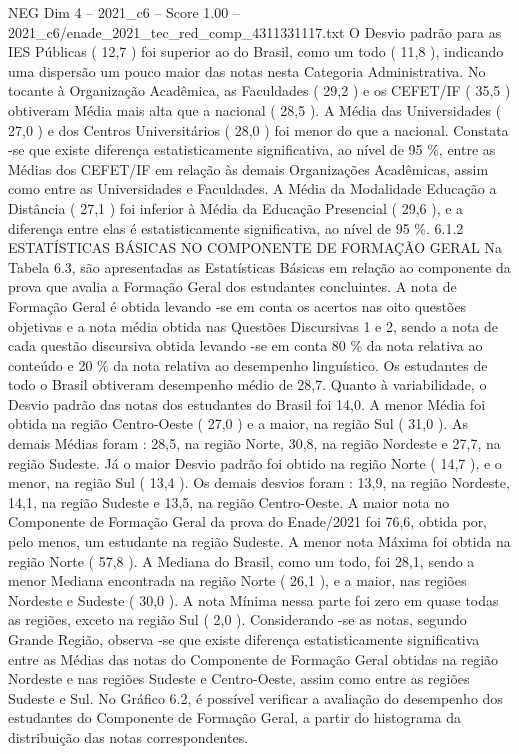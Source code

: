 \begin{textsample}{NEG Dim 4 – 2021\_c6 – Score 1.00 – 2021\_c6/enade\_2021\_tec\_red\_comp\_4311331117.txt}
O Desvio padrão para as IES Públicas ( 12,7 ) foi superior ao do Brasil, como um todo ( 11,8 ), indicando uma dispersão um pouco maior das notas nesta Categoria Administrativa.
No tocante à Organização Acadêmica, as Faculdades ( 29,2 ) e os CEFET/IF ( 35,5 ) obtiveram Média mais alta que a nacional ( 28,5 ).
A Média das Universidades ( 27,0 ) e dos Centros Universitários ( 28,0 ) foi menor do que a nacional.
Constata -se que existe diferença estatisticamente significativa, ao nível de 95 \%, entre as Médias dos CEFET/IF em relação às demais Organizações Acadêmicas, assim como entre as Universidades e Faculdades.
A Média da Modalidade Educação a Distância ( 27,1 ) foi inferior à Média da Educação Presencial ( 29,6 ), e a diferença entre elas é estatisticamente significativa, ao nível de 95 \%. 6.1.2 ESTATÍSTICAS BÁSICAS NO COMPONENTE DE FORMAÇÃO GERAL Na Tabela 6.3, são apresentadas as Estatísticas Básicas em relação ao componente da prova que avalia a Formação Geral dos estudantes concluintes.
A nota de Formação Geral é obtida levando -se em conta os acertos nas oito questões objetivas e a nota média obtida nas Questões Discursivas 1 e 2, sendo a nota de cada questão discursiva obtida levando -se em conta 80 \% da nota relativa ao conteúdo e 20 \% da nota relativa ao desempenho linguístico.
Os estudantes de todo o Brasil obtiveram desempenho médio de 28,7.
Quanto à variabilidade, o Desvio padrão das notas dos estudantes do Brasil foi 14,0.
A menor Média foi obtida na região Centro-Oeste ( 27,0 ) e a maior, na região Sul ( 31,0 ).
As demais Médias foram : 28,5, na região Norte, 30,8, na região Nordeste e 27,7, na região Sudeste.
Já o maior Desvio padrão foi obtido na região Norte ( 14,7 ), e o menor, na região Sul ( 13,4 ).
Os demais desvios foram : 13,9, na região Nordeste, 14,1, na região Sudeste e 13,5, na região Centro-Oeste.
A maior nota no Componente de Formação Geral da prova do Enade/2021 foi 76,6, obtida por, pelo menos, um estudante na região Sudeste.
A menor nota Máxima foi obtida na região Norte ( 57,8 ).
A Mediana do Brasil, como um todo, foi 28,1, sendo a menor Mediana encontrada na região Norte ( 26,1 ), e a maior, nas regiões Nordeste e Sudeste ( 30,0 ).
A nota Mínima nessa parte foi zero em quase todas as regiões, exceto na região Sul ( 2,0 ).
Considerando -se as notas, segundo Grande Região, observa -se que existe diferença estatisticamente significativa entre as Médias das notas do Componente de Formação Geral obtidas na região Nordeste e nas regiões Sudeste e Centro-Oeste, assim como entre as regiões Sudeste e Sul.
No Gráfico 6.2, é possível verificar a avaliação do desempenho dos estudantes do Componente de Formação Geral, a partir do histograma da distribuição das notas correspondentes.

\end{textsample}
